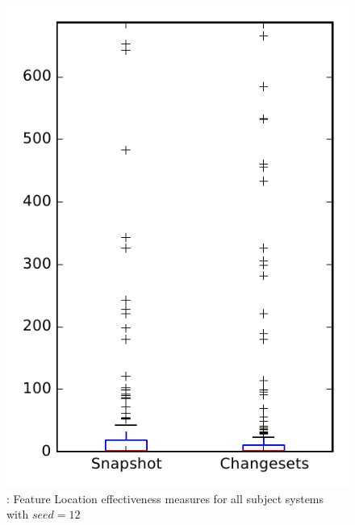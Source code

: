 
\begin{figure}
\centering
\includegraphics[height=0.4\textheight]{figures/flt_seed/rq1_overview_12}
\caption{\rone: Feature Location effectiveness measures for all subject systems with $seed=12$}
\label{fig:flt_seed:rq1:overview}
\end{figure}
